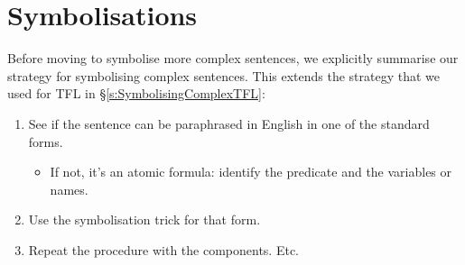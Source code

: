 %
%
%


\section{Symbolisations}
\label{s:SymbolisingComplexFOL}
Before moving to symbolise more complex sentences, we explicitly summarise our strategy for symbolising complex sentences. This extends the strategy that we used for TFL in \S\ref{s:SymbolisingComplexTFL}:

\begin{highlighted}
\begin{enumerate}
\item See if the sentence can be paraphrased in English in one of the standard forms.
	\begin{itemize}
	\item If not, it's an atomic formula: identify the predicate and the variables or names. 
	\end{itemize}
\item Use the symbolisation trick for that form. 
\item Repeat the procedure with the components. Etc.
\end{enumerate}
\end{highlighted}

